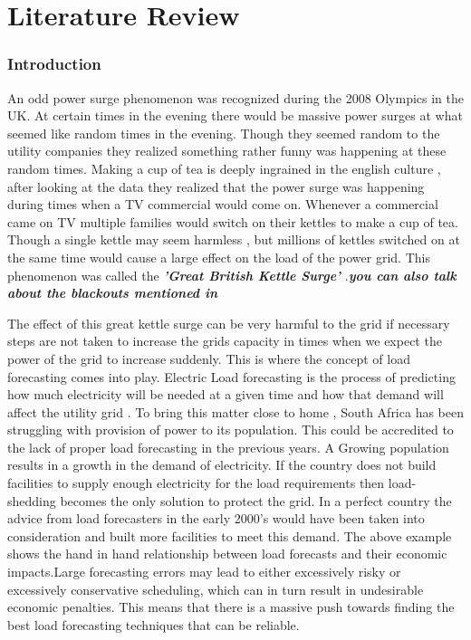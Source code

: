 \chapter{Literature Review}
\subsection{Introduction}
An odd power surge phenomenon was recognized during the 2008 Olympics in the UK. At certain times in  the evening there would be massive power surges at what seemed like random times in the evening. Though they seemed random to the utility companies they realized something rather funny was happening at these random times. Making a cup of tea is deeply ingrained in the english culture , after looking at the data they realized that the power surge was happening during times when a TV commercial would come on. Whenever a commercial came on TV multiple families would switch on their kettles to make a cup of tea. Though a single kettle may seem harmless  , but millions of kettles switched on at the same time would cause a large effect on the load of the power grid. This phenomenon was called the \textbf{\textit{'Great British Kettle Surge'}} \cite{kettle_surge}.\textit{\textbf{you can also talk about the blackouts mentioned in \cite{li2023ultra}}}

The effect of this great kettle surge can be very harmful to the grid if necessary steps are not taken to increase the grids capacity in times when we expect the power of the grid to increase suddenly. This is where the concept of load forecasting comes into play.
Electric Load forecasting is the process of predicting how much electricity will be needed at a given time and how that demand will affect the utility grid \cite{IBM_loadforecasting}. To bring this matter close to home , South Africa has been struggling with provision of power to its population. This could be accredited to the lack of proper load forecasting in the previous years. A Growing population results in a growth in the demand of electricity. If the country does not build facilities to supply enough electricity for the load requirements then  load-shedding becomes the only solution to protect the grid. In a perfect country the advice from load forecasters in the early 2000's would have been taken into consideration and built more facilities to meet this demand.
The above example shows the hand in hand relationship between load forecasts and their economic impacts.Large forecasting errors may lead to either excessively risky or excessively conservative
scheduling, which can in turn result in undesirable economic penalties\cite{festas2001computational}. This means that there is a massive push towards finding the best load forecasting techniques that can be reliable.


